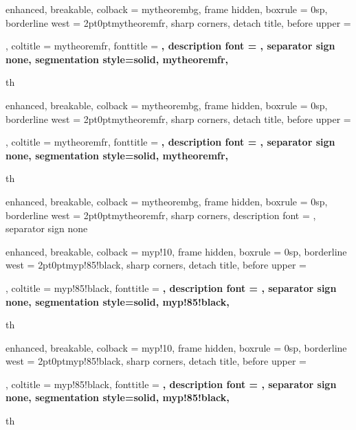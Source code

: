 
\setlength{\parindent}{1cm}

{%
  enhanced,
  breakable,
  colback = mytheorembg,
  frame hidden,
  boxrule = 0sp,
  borderline west = {2pt}{0pt}{mytheoremfr},
  sharp corners,
  detach title,
  before upper = \tcbtitle\par\smallskip,
  coltitle = mytheoremfr,
  fonttitle = \bfseries\sffamily,
  description font = \mdseries,
  separator sign none,
  segmentation style={solid, mytheoremfr},
}{th}

{%
  enhanced,
  breakable,
  colback = mytheorembg,
  frame hidden,
  boxrule = 0sp,
  borderline west = {2pt}{0pt}{mytheoremfr},
  sharp corners,
  detach title,
  before upper = \tcbtitle\par\smallskip,
  coltitle = mytheoremfr,
  fonttitle = \bfseries\sffamily,
  description font = \mdseries,
  separator sign none,
  segmentation style={solid, mytheoremfr},
}{th}

{%
  enhanced,
  breakable,
  colback = mytheorembg,
  frame hidden,
  boxrule = 0sp,
  borderline west = {2pt}{0pt}{mytheoremfr},
  sharp corners,
  description font = \mdseries,
  separator sign none
}

{%
  enhanced,
  breakable,
  colback = myp!10,
  frame hidden,
  boxrule = 0sp,
  borderline west = {2pt}{0pt}{myp!85!black},
  sharp corners,
  detach title,
  before upper = \tcbtitle\par\smallskip,
  coltitle = myp!85!black,
  fonttitle = \bfseries\sffamily,
  description font = \mdseries,
  separator sign none,
  segmentation style={solid, myp!85!black},
}{th}

{%
  enhanced,
  breakable,
  colback = myp!10,
  frame hidden,
  boxrule = 0sp,
  borderline west = {2pt}{0pt}{myp!85!black},
  sharp corners,
  detach title,
  before upper = \tcbtitle\par\smallskip,
  coltitle = myp!85!black,
  fonttitle = \bfseries\sffamily,
  description font = \mdseries,
  separator sign none,
  segmentation style={solid, myp!85!black},
}{th}

